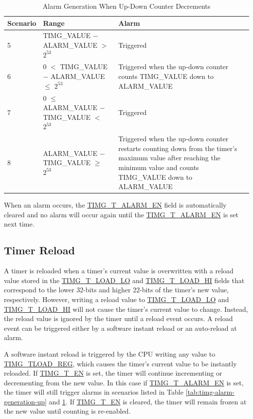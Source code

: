 \documentclass[main\_\_EN.tex]{subfiles}
\begin{document}
\begin{table}[H]
\centering
\caption{Alarm Generation When Up-Down Counter Decrements}
\label{tab:timg-alarm-generation-down}

\begin{tabular}{|l|l|m{7cm}|}
\hline
\rowcolor{lightgray}
    \textbf{Scenario} & \textbf{Range} & \textbf{Alarm} \\\hline
     5 & TIMG\_VALUE $-$ ALARM\_VALUE  $>$ $2^{53}$ & Triggered \\\hline
     6 &  0 $<$ TIMG\_VALUE $-$ ALARM\_VALUE $\leq$ $2^{53}$ & Triggered when the up-down counter counts TIMG\_VALUE down to ALARM\_VALUE \\\hline
     7 & 0 $\leq$ ALARM\_VALUE $-$ TIMG\_VALUE $<$ $2^{53}$ & Triggered \\\hline
     8 & ALARM\_VALUE $-$ TIMG\_VALUE $\geq$ $2^{53}$ & Triggered when the up-down counter restarts counting down from the timer's maximum value after reaching the minimum value and counts TIMG\_VALUE down to ALARM\_VALUE \\\hline

\end{tabular}
\end{table}

When an alarm occurs, the \hyperref[fielddesc:TIMGTXALARMEN]{TIMG\_T\_ALARM\_EN} field is automatically cleared and no alarm will occur again until the \hyperref[fielddesc:TIMGTXALARMEN]{TIMG\_T\_ALARM\_EN} is set next time.

\subsection{Timer Reload} \label{sec:timg-func-descr-reload}
A timer is reloaded when a timer's current value is overwritten with a reload value stored in the \hyperref[fielddesc:TIMGTXLOADLO]{TIMG\_T\_LOAD\_LO} and \hyperref[fielddesc:TIMGTXLOADHI]{TIMG\_T\_LOAD\_HI} fields that correspond to the lower 32-bits and higher 22-bits of the timer's new value, respectively. However, writing a reload value to \hyperref[fielddesc:TIMGTXLOADLO]{TIMG\_T\_LOAD\_LO} and \hyperref[fielddesc:TIMGTXLOADHI]{TIMG\_T\_LOAD\_HI} will not cause the timer's current value to change. Instead, the reload value is ignored by the timer until a reload event occurs. A reload event can be triggered either by a software instant reload or an auto-reload at alarm.

A software instant reload is triggered by the CPU writing any value to \hyperref[regdesc:TIMGTXLOADREG]{TIMG\_TLOAD\_REG}, which causes the timer's current value to be instantly reloaded. If \hyperref[fielddesc:TIMGTXEN]{TIMG\_T\_EN} is set, the timer will continue incrementing or decrementing from the new value. In this case if \hyperref[fielddesc:TIMGTXALARMEN]{TIMG\_T\_ALARM\_EN} is set, the timer will still trigger alarms in scenarios listed in Table \ref{tab:timg-alarm-generation-up} and \ref{tab:timg-alarm-generation-down}. If \hyperref[fielddesc:TIMGTXEN]{TIMG\_T\_EN} is cleared, the timer will remain frozen at the new value until counting is re-enabled.
\end{document}
